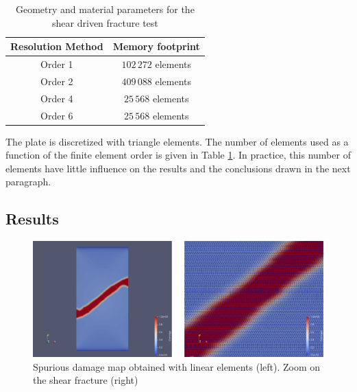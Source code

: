 \begin{table}[H]
    \centering
    \begin{tabular}{||c c||} 
        \hline
        Resolution Method & Memory footprint
        \\
        [0.5ex] 
        \hline\hline
        Order 1 & \(102\,272\) elements
        \\ \hline
        Order 2 & \(409\,088\) elements
        \\ \hline
        Order 4 & \(25\,568\) elements 
        \\ \hline
        Order 6 & \(25\,568\) elements 
        \\ \hline
    \end{tabular}
    \caption{Geometry and material parameters for the shear driven fracture test}
    \label{tbl:micromorphicdamage:shear_driven_fracture_test_elements}
\end{table}

The plate is discretized with triangle elements. The number of elements
used as a function of the finite element order is given in Table
\ref{tbl:micromorphicdamage:shear_driven_fracture_test_elements}. In
practice, this number of elements have little influence on the results
and the conclusions drawn in the next paragraph.

\subsection{Results}

\begin{figure}[H]
  \centering
  \includegraphics[width=10.cm]{../chapter_003_ef_micromorphic/figures/shear-driven-fracture-damage-results-order-1.pdf}
  \caption{Spurious damage map obtained with linear elements (left). Zoom on the shear fracture (right)}
  \label{fig:micromorphicdamage:shear_driven_fracture_test_order1}
\end{figure}


